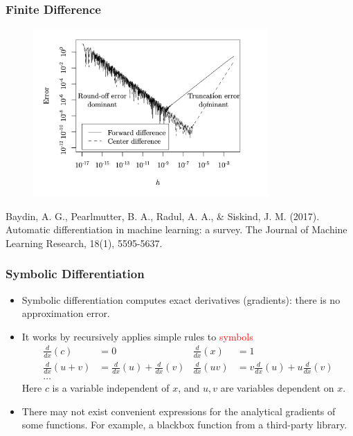 \documentclass{beamer}
\begin{document}
\begin{frame}
	\frametitle{Finite Difference}
	\begin{figure}[hbt]
		\centering
		\includegraphics[width=0.8\textwidth]{figures/fd_error}
	\end{figure}
	\vspace{-0.5cm}
	\scriptsize{Baydin, A. G., Pearlmutter, B. A., Radul, A. A., \& Siskind, J. M. (2017). Automatic differentiation in machine learning: a survey. The Journal of Machine Learning Research, 18(1), 5595-5637.}
\end{frame}

\begin{frame}
	\frametitle{Symbolic Differentiation }

	\begin{itemize}
		\item Symbolic differentiation computes exact derivatives (gradients): there is no approximation error.
		\item It works by recursively applies simple rules to \textcolor{red}{symbols}
		      \begin{align*}
			      \frac{d}{dx}(c)   & = 0                                 & \frac{d}{dx}(x)  & = 1                                 \\
			      \frac{d}{dx}(u+v) & = \frac{d}{dx}(u) + \frac{d}{dx}(v) & \frac{d}{dx}(uv) & = v\frac{d}{dx}(u)+u\frac{d}{dx}(v) \\
			      \ldots
		      \end{align*}
		      Here $c$ is a variable independent of $x$, and $u, v$ are variables dependent on $x$.

		\item There may not exist convenient expressions for the analytical gradients of some functions. For example, a blackbox function from a third-party library.

	\end{itemize}
\end{frame}
\end{document}
